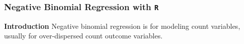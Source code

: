 \documentclass[00-GLMregslides.tex]{subfiles}
\begin{document}
	

\begin{frame}[fragile]
\frametitle{Negative Binomial Regression with \texttt{R} }
\Large

\textbf{Introduction}
Negative binomial regression is for modeling count variables, usually for over-dispersed count outcome variables.

\end{frame}
\end{document}
